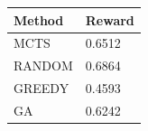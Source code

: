 \begin{tabular}{ll}
\hline
Method & Reward \\
\hline
  MCTS & 0.6512 \\
  RANDOM & 0.6864 \\
  GREEDY & 0.4593 \\
  GA & 0.6242 \\
\hline
\end{tabular}
